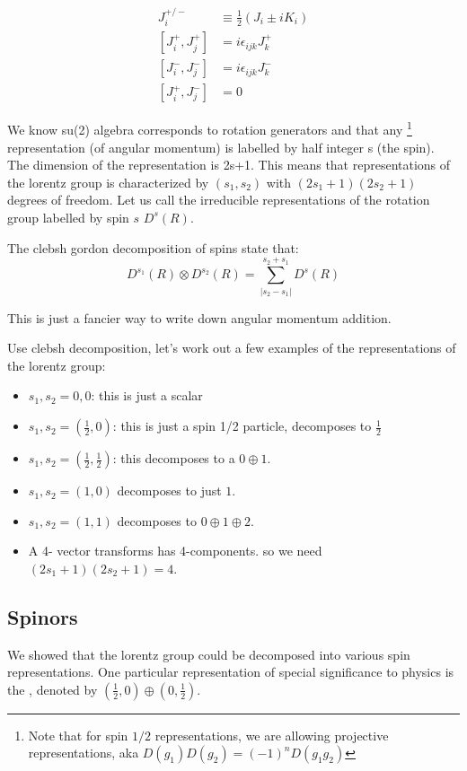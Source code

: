 \documentclass[11pt]{scrartcl}
\begin{document}
\begin{align}
	J_i^{+/-} &\equiv \frac12 \left(J_i \pm i K_i \right) \\
	[J_i^+, J^+_j] &= i \epsilon_{ijk} J^+_k \\
	[J_i^-, J^-_j] &= i \epsilon_{ijk} J^-_k \\
	[J_i^+, J_j^-] &= 0
\end{align}

We know su(2) algebra corresponds to rotation generators and that any \footnote{Note that for spin $1/2$ representations, we are allowing projective representations, aka $D(g_1) D(g_2) = (-1)^{n} D(g_1 g_2)$ } representation (of angular momentum) is labelled by half integer s (the spin).  The dimension of the representation is 2s+1.
This means that representations of the lorentz group is characterized by  $(s_1, s_2)$ with $(2s_1 + 1)(2s_2+1)$ degrees of freedom.
Let us call the irreducible representations of the rotation group labelled by spin $s$ $D^s(R)$.

\begin{lemma}
	The clebsh gordon decomposition of spins state that:
	\[D^{s_1}(R) \otimes D^{s_2}(R) = \sum_{|s_2 - s_1|}^{s_2 + s_1} D^{s} (R) \]
	
	This is just a fancier way to write down angular momentum addition.
\end{lemma}


Use clebsh decomposition, let's work out a few examples of the representations of the lorentz group:
\begin{itemize}
	\item $s_1, s_2 = 0, 0$: this is just a scalar
	\item $s_1, s_2 = (\frac12, 0)$: this is just a spin 1/2 particle, decomposes to $\frac12$
	\item $s_1, s_2 = (\frac12, \frac12)$: this decomposes to a $ 0 \oplus 1$.
	\item $s_1, s_2 = (1, 0)$ decomposes to just $1$.
	\item $s_1, s_2 = (1, 1)$ decomposes to $0 \oplus 1 \oplus 2$.
	\item A 4- vector transforms has 4-components.  so we need $(2 s_1 + 1) (2 s_2+1) = 4$.  
\end{itemize}

\subsection{Spinors}
We showed that the lorentz group could be decomposed into various spin representations.  One particular representation of special significance to physics is the , denoted by $(\frac12, 0) \oplus (0, \frac12 ) $.
\end{document}
